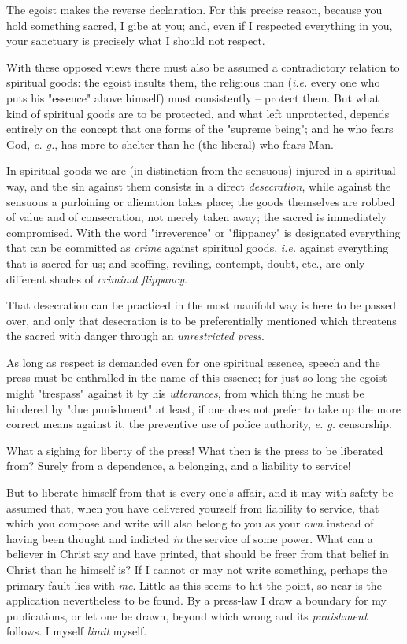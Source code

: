 \documentclass[a4paper]{book}
\begin{document}
The egoist makes the reverse declaration. For this precise reason, because you 
hold something sacred, I gibe at you; and, even if I respected everything in 
you, your sanctuary is precisely what I should not respect.

With these opposed views there must also be assumed a contradictory relation 
to spiritual goods: the egoist insults them, the religious man (\textit{i.e.} 
every one who puts his "{}essence"{} above himself) must consistently -- 
protect them. But what kind of spiritual goods are to be protected, and what 
left unprotected, depends entirely on the concept that one forms of the 
"{}supreme being"{}; and he who fears God, \textit{e. g.}, has more to shelter 
than he (the liberal) who fears Man.

In spiritual goods we are (in distinction from the sensuous) injured in a 
spiritual way, and the sin against them consists in a direct 
\textit{desecration}, while against the sensuous a purloining or alienation 
takes place; the goods themselves are robbed of value and of consecration, not 
merely taken away; the sacred is immediately compromised. With the word 
"{}irreverence"{} or "{}flippancy"{} is designated everything that can be 
committed as \textit{crime} against spiritual goods, \textit{i.e.} against 
everything that is sacred for us; and scoffing, reviling, contempt, doubt, 
etc., are only different shades of \textit{criminal flippancy}.

That desecration can be practiced in the most manifold way is here to be 
passed over, and only that desecration is to be preferentially mentioned which 
threatens the sacred with danger through an \textit{unrestricted press}.

As long as respect is demanded even for one spiritual essence, speech and the 
press must be enthralled in the name of this essence; for just so long the 
egoist might "{}trespass"{} against it by his \textit{utterances}, from which 
thing he must be hindered by "{}due punishment"{} at least, if one does not 
prefer to take up the more correct means against it, the preventive use of 
police authority, \textit{e. g.} censorship.

What a sighing for liberty of the press! What then is the press to be 
liberated from? Surely from a dependence, a belonging, and a liability to 
service!

But to liberate himself from that is every one's affair, and it may with 
safety be assumed that, when you have delivered yourself from liability to 
service, that which you compose and write will also belong to you as your 
\textit{own} instead of having been thought and indicted \textit{in} the 
service of some power. What can a believer in Christ say and have printed, 
that should be freer from that belief in Christ than he himself is? If I 
cannot or may not write something, perhaps the primary fault lies with 
\textit{me}. Little as this seems to hit the point, so near is the application 
nevertheless to be found. By a press-law I draw a boundary for my 
publications, or let one be drawn, beyond which wrong and its 
\textit{punishment} follows. I myself \textit{limit} myself.
\end{document}
